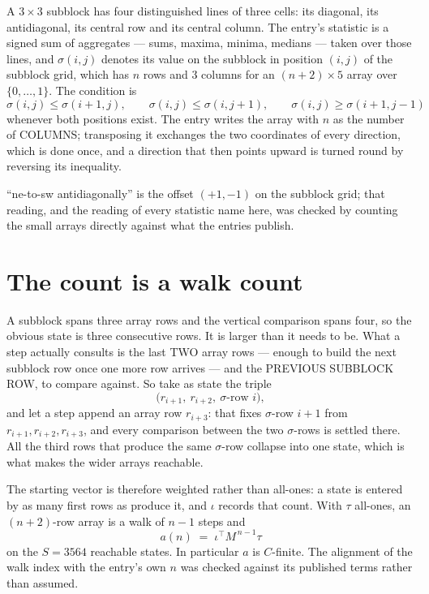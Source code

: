 \documentclass[11pt,a4paper]{article}
\theoremstyle{plain}
\theoremstyle{definition}
\begin{document}
A $3\times3$ subblock has four distinguished lines of three cells: its diagonal, its
antidiagonal, its central row and its central column. The entry's statistic is a signed sum of
aggregates --- sums, maxima, minima, medians --- taken over those lines, and $\sigma(i,j)$
denotes its value on the subblock in position $(i,j)$ of the subblock grid, which has $n$ rows
and $3$ columns for an $(n+2)\times5$ array over $\{0,\dots,1\}$. The condition is
\[
\sigma(i,j)\le\sigma(i+1,j),\qquad \sigma(i,j)\le\sigma(i,j+1),\qquad \sigma(i,j)\ge\sigma(i+1,j-1)
\]
whenever both positions exist. The entry writes the array with $n$ as the number of COLUMNS; transposing it exchanges the two coordinates of every direction, which is done once, and a direction that then points upward is turned round by reversing its inequality.

``ne-to-sw antidiagonally'' is the offset $(+1,-1)$ on the subblock grid; that reading, and
the reading of every statistic name here, was checked by counting the small arrays directly
against what the entries publish.

\section{The count is a walk count}

A subblock spans three array rows and the vertical comparison spans four, so the obvious state
is three consecutive rows. It is larger than it needs to be. What a step actually consults is
the last TWO array rows --- enough to build the next subblock row once one more row arrives ---
and the PREVIOUS SUBBLOCK ROW, to compare against. So take as state the triple
\[
\bigl(r_{i+1},\ r_{i+2},\ \sigma\text{-row }i\bigr),
\]
and let a step append an array row $r_{i+3}$: that fixes $\sigma$-row $i+1$ from
$r_{i+1},r_{i+2},r_{i+3}$, and every comparison between the two $\sigma$-rows is settled
there. All the third rows that produce the same $\sigma$-row collapse into one state, which is
what makes the wider arrays reachable.

The starting vector is therefore weighted rather than all-ones: a state is entered by as many
first rows as produce it, and $\iota$ records that count. With $\tau$ all-ones, an
$(n+2)$-row array is a walk of $n-1$ steps and
\[
a(n)\;=\;\iota^{\!\top}M^{\,n-1}\tau
\]
on the $S=3564$ reachable states. In particular $a$ is $C$-finite. The alignment of the walk
index with the entry's own $n$ was checked against its published terms rather than assumed.
\end{document}
